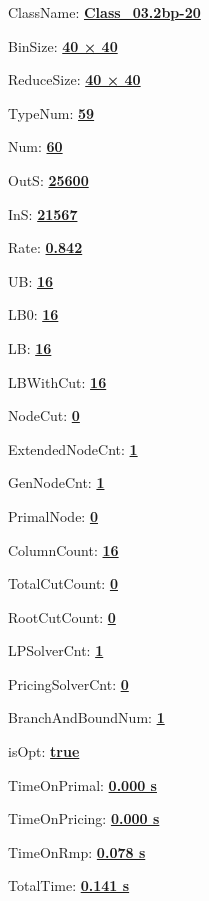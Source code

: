 \documentclass[11pt]{article}
\begin{document}
\pagestyle{empty}


ClassName: \underline{\textbf{Class_03.2bp-20}}
\par
BinSize: \underline{\textbf{40 × 40}}
\par
ReduceSize: \underline{\textbf{40 × 40}}
\par
TypeNum: \underline{\textbf{59}}
\par
Num: \underline{\textbf{60}}
\par
OutS: \underline{\textbf{25600}}
\par
InS: \underline{\textbf{21567}}
\par
Rate: \underline{\textbf{0.842}}
\par
UB: \underline{\textbf{16}}
\par
LB0: \underline{\textbf{16}}
\par
LB: \underline{\textbf{16}}
\par
LBWithCut: \underline{\textbf{16}}
\par
NodeCut: \underline{\textbf{0}}
\par
ExtendedNodeCnt: \underline{\textbf{1}}
\par
GenNodeCnt: \underline{\textbf{1}}
\par
PrimalNode: \underline{\textbf{0}}
\par
ColumnCount: \underline{\textbf{16}}
\par
TotalCutCount: \underline{\textbf{0}}
\par
RootCutCount: \underline{\textbf{0}}
\par
LPSolverCnt: \underline{\textbf{1}}
\par
PricingSolverCnt: \underline{\textbf{0}}
\par
BranchAndBoundNum: \underline{\textbf{1}}
\par
isOpt: \underline{\textbf{true}}
\par
TimeOnPrimal: \underline{\textbf{0.000 s}}
\par
TimeOnPricing: \underline{\textbf{0.000 s}}
\par
TimeOnRmp: \underline{\textbf{0.078 s}}
\par
TotalTime: \underline{\textbf{0.141 s}}
\par
\newpage


\end{document}
